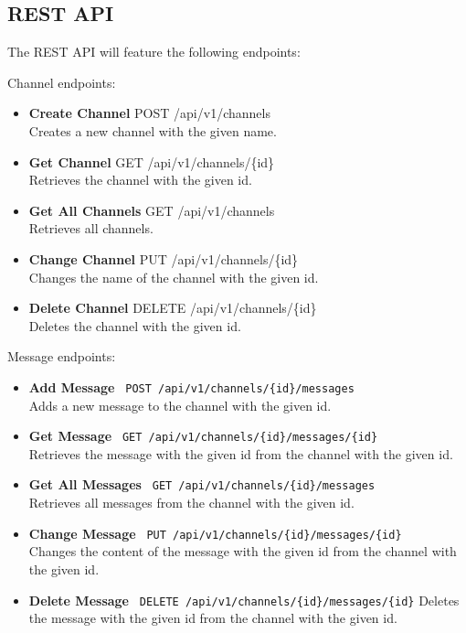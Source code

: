 \documentclass[a4paper,12pt]{article}
\begin{document}
	\subsection{REST API}
	\label{subsec:rest_api}
	The REST API will feature the following endpoints:

	Channel endpoints:
	\begin{itemize}
		\item \textbf{Create Channel} \- POST /api/v1/channels \\
		Creates a new channel with the given name.
		\item \textbf{Get Channel} \- GET /api/v1/channels/\{id\} \\
		Retrieves the channel with the given id.
		\item \textbf{Get All Channels} \- GET /api/v1/channels \\
		Retrieves all channels.
		\item \textbf{Change Channel} \- PUT /api/v1/channels/\{id\} \\
		Changes the name of the channel with the given id.
		\item \textbf{Delete Channel} \- DELETE /api/v1/channels/\{id\} \\
		Deletes the channel with the given id.
	\end{itemize}

	Message endpoints:
	\begin{itemize}
		\item \textbf{Add Message} \- \texttt{ POST /api/v1/channels/\{id\}/messages } \\
		Adds a new message to the channel with the given id.
		\item \textbf{Get Message} \- \texttt{ GET /api/v1/channels/\{id\}/messages/\{id\} } \\
		Retrieves the message with the given id from the channel with the given id.
		\item \textbf{Get All Messages} \- \texttt{ GET /api/v1/channels/\{id\}/messages } \\
		Retrieves all messages from the channel with the given id.
		\item \textbf{Change Message} \- \texttt{ PUT /api/v1/channels/\{id\}/messages/\{id\} } \\
		Changes the content of the message with the given id from the channel with the given id.
		\item \textbf{Delete Message} \- \texttt{ DELETE /api/v1/channels/\{id\}/messages/\{id\}}
		Deletes the message with the given id from the channel with the given id.
	\end{itemize}
\end{document}
